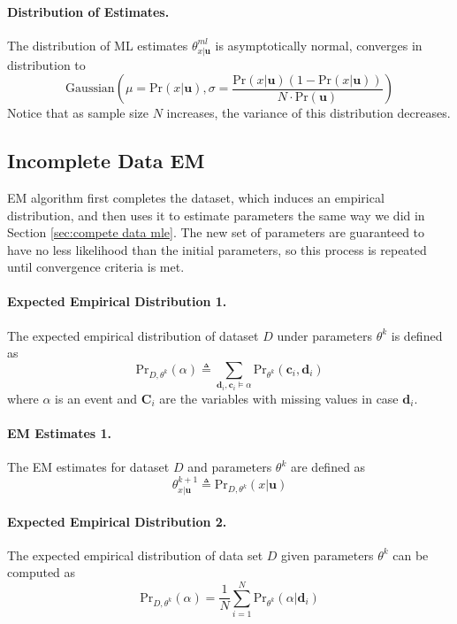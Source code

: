 \documentclass[11pt]{article}
\newcommand{\bc}{\mathbf{c}}
\newcommand{\bd}{\mathbf{d}}
\newcommand{\bu}{\mathbf{u}}
\newcommand{\pr}{\mathrm{Pr}}
\begin{document}
\paragraph{Distribution of Estimates.} The distribution of ML estimates $\theta_{x|\bu}^{ml}$ is asymptotically normal, converges in distribution to 
\begin{equation}
	\mathrm{Gaussian} \left ( 
	\mu = \pr(x | \bu ), \sigma = \frac{\pr(x | \bu) (1 - \pr(x | \bu)) }{N \cdot \pr(\bu) }
	\right) 
\end{equation}
Notice that as sample size $N$ increases, the variance of this distribution decreases. 

\subsection{Incomplete Data EM}
EM algorithm first completes the dataset, which induces an empirical distribution, and then uses it to estimate parameters the same way we did in Section \ref{sec:compete data mle}. The new set of parameters are guaranteed to have no less likelihood than the initial parameters, so this process is repeated until convergence criteria is met. 

\paragraph{Expected Empirical Distribution 1.} The expected empirical distribution of dataset $D$ under parameters $\theta^k$ is defined as 
\begin{equation}
	\pr_{D, \theta^k} (\alpha) \triangleq \sum_{\bd_i, \bc_i \vDash \alpha} \pr_{\theta^k}(\bc_i, \bd_i)
\end{equation}
where $\alpha$ is an event and $\mathbf C_i$ are the variables with missing values in case $\bd_i$. 

\paragraph{EM Estimates 1.}  The EM estimates for dataset $D$ and parameters $\theta^k$ are defined as 
\begin{equation}
	\theta_{x|\mathbf u}^{k + 1} \triangleq \pr_{D, \theta^k} (x|\bu)
\end{equation}

\paragraph{Expected Empirical Distribution 2.} The expected empirical distribution of data set $D$ given parameters $\theta^k$ can be computed as 
\begin{equation}
	\pr_{D, \theta^k} (\alpha) = \frac{1}{N} \sum_{i = 1}^N \pr_{\theta^k}  (\alpha | \bd_i)
\end{equation}
\end{document}
